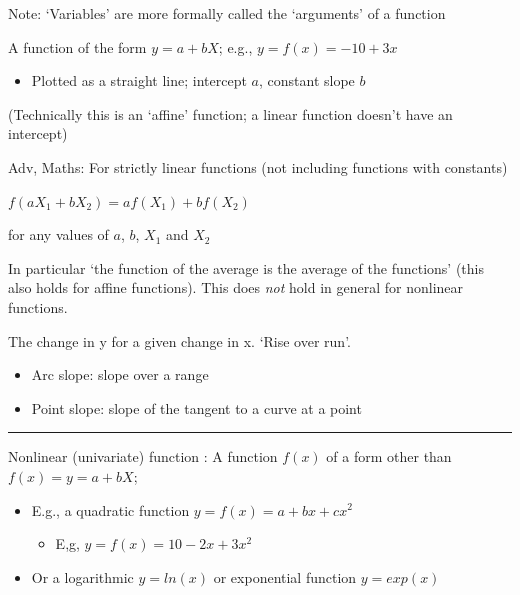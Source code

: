 \documentclass[]{article}
\providecommand{\tightlist}{%
  \setlength{\itemsep}{0pt}\setlength{\parskip}{0pt}}
\begin{document}
Note: `Variables' are more formally called the `arguments' of a function

\bigskip

\begin{description}
\tightlist
\item[Linear function]
A function of the form \(y=a+bX\); e.g., \(y = f(x) = -10 + 3x\)
\end{description}

\begin{itemize}
\tightlist
\item
  Plotted as a straight line; intercept \(a\), constant slope \(b\)
\end{itemize}

(Technically this is an `affine' function; a linear function doesn't
have an intercept)

Adv, Maths: For strictly linear functions (not including functions with
constants)

\(f(a X_1 + b X_2) = a f(X_1) + b f(X_2)\)

for any values of \(a\), \(b\), \(X_1\) and \(X_2\)

In particular `the function of the average is the average of the
functions' (this also holds for affine functions). This does \emph{not}
hold in general for nonlinear functions.

\bigskip

\begin{description}
\tightlist
\item[Slope of \(y = f(x)\)]
The change in y for a given change in x. `Rise over run'.
\end{description}

\begin{itemize}
\item
  Arc slope: slope over a range
\item
  Point slope: slope of the tangent to a curve at a point
\end{itemize}

\begin{center}\rule{0.5\linewidth}{\linethickness}\end{center}

Nonlinear (univariate) function : A function \(f(x)\) of a form other
than \(f(x) = y=a+bX\);

\begin{itemize}
\tightlist
\item
  E.g., a quadratic function \(y = f(x) = a + bx + cx^2\)

  \begin{itemize}
  \tightlist
  \item
    E,g, \(y = f(x) = 10 - 2x + 3x^2\)
  \end{itemize}
\item
  Or a logarithmic \(y=ln(x)\) or exponential function \(y = exp(x)\)
\end{itemize}
\end{document}

